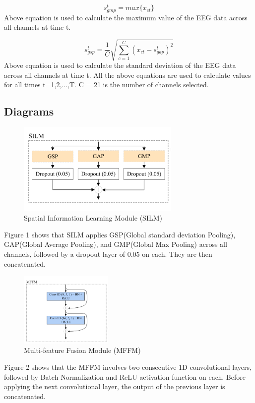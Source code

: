 \documentclass[10pt]{article}
\begin{document}
\[ s_{gmp}^t = max\{x_{ct}\} \]
Above equation is used to calculate the maximum value of the EEG data across all channels at time t.

\[ s_{gsp}^t = \frac{1}{C} \sqrt{\sum_{c=1}^{C} (x_{ct} - s_{gap}^t)^2} \]
Above equation is used to calculate the standard deviation of the EEG data across all channels at time t.
\newline
All the above equations are used to calculate values for all times t=1,2,...,T. C = 21 is the number of channels selected.

\subsection{Diagrams}
\begin{figure}[H]
    \centering
    \includegraphics[width=0.7\textwidth]{silm.png}
    \caption{Spatial Information Learning Module (SILM)}
\end{figure}
Figure 1 shows that SILM applies GSP(Global standard deviation Pooling), GAP(Global Average Pooling), and GMP(Global Max Pooling) across all channels, followed by a dropout layer of 0.05 on each. They are then concatenated.

\begin{figure}[H]
    \centering
    \includegraphics[width=0.4\textwidth]{mffm.png}
    \caption{Multi-feature Fusion Module (MFFM)}
\end{figure}
Figure 2 shows that the MFFM involves two consecutive 1D convolutional layers, followed by Batch Normalization and ReLU activation function on each. Before applying the next convolutional layer, the output of the previous layer is concatenated.
\end{document}
